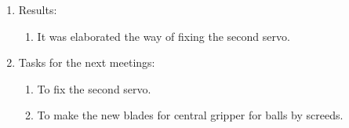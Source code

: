 \begin{enumerate}
\begin{enumerate}
	\end{enumerate}
	
	\item Results:
	\begin{enumerate}
		
		\item It was elaborated the way of fixing the second servo.
		
	\end{enumerate}
	
	\item Tasks for the next meetings:
	\begin{enumerate}
		
		\item To fix the second servo.
		
		\item To make the new blades for central gripper for balls by screeds.
			
	\end{enumerate}
\end{enumerate}
\fillpage
